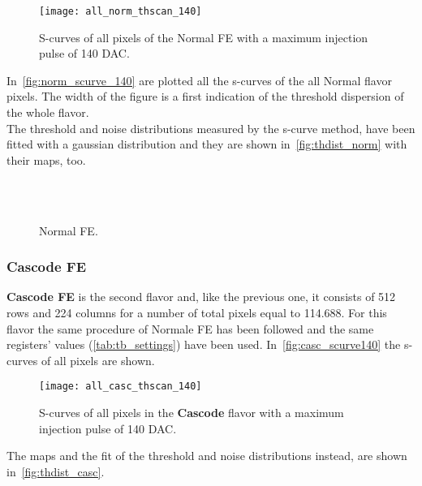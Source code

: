 \begin{figure}[h!]
\centering
\texttt{[image: all\_norm\_thscan\_140]}
\caption{S-curves of all pixels of the Normal FE with a maximum injection pulse of 140 DAC.}
\label{fig:norm_scurve_140}
\end{figure}


In~\autoref{fig:norm_scurve_140} are plotted all the s-curves of the all Normal flavor pixels. The width of the figure is a first indication of the threshold dispersion of the whole flavor.\\

The threshold and noise distributions measured by the s-curve method, have been fitted with a gaussian distribution and they are shown in~\autoref{fig:thdist_norm} with their maps, too.

\begin{figure}[h!]
\centering
{}\quad
{}\\
\quad
{}\\
\caption{Normal FE.}
\label{fig:thdist_norm}
\end{figure}



\subsubsection{Cascode FE}

\textbf{Cascode FE} is the second flavor and, like the previous one, it consists of 512 rows and 224 columns for a number of total pixels equal to 114.688. For this flavor the same procedure of Normale FE has been followed and the same registers' values (\autoref{tab:tb_settings}) have been used.
In~\autoref{fig:casc_scurve140} the s-curves of all pixels are shown.

\begin{figure}[h!]
\centering
\texttt{[image: all\_casc\_thscan\_140]}
\caption{S-curves of all pixels in the \textbf{Cascode} flavor with a maximum injection pulse of 140 DAC.}
\label{fig:casc_scurve140}
\end{figure}

The maps and the fit of the threshold and noise distributions instead, are shown in~\autoref{fig:thdist_casc}.


